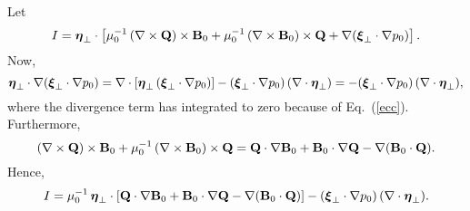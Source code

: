 \documentclass[12pt,prb,aps,notitlepage]{revtex4-1}
\newcommand{\bxi}{\mbox{\boldmath$\xi$}}
\newcommand{\bta}{\mbox{\boldmath$\eta$}}
\begin{document}
Let 
\begin{equation}\label{e43}
I= \bta_\perp\cdot\left[ \mu_0^{-1}\,(\nabla\times {\bf Q})\times{\bf B}_0+ \mu_0^{-1}\, (\nabla\times {\bf B}_0)\times {\bf Q}
+\nabla(\bxi_\perp\cdot\nabla p_0)\right].
\end{equation}
Now,
\begin{equation}
\bta_\perp\cdot\nabla (\bxi_\perp\cdot\nabla p_0)= \nabla\cdot[\bta_\perp\,(\bxi_\perp\cdot \nabla p_0)] - (\bxi_\perp\cdot\nabla p_0)\,(\nabla\cdot
\bta_\perp) =-(\bxi_\perp\cdot\nabla p_0)\,(\nabla\cdot
\bta_\perp),
\end{equation}
where the divergence term has integrated to zero because of Eq.~(\ref{ecc}). Furthermore, 
\begin{equation}
(\nabla\times {\bf Q})\times{\bf B}_0+ \mu_0^{-1}\, (\nabla\times {\bf B}_0)\times {\bf Q}= {\bf Q}\cdot\nabla{\bf B}_0
+ {\bf B}_0\cdot\nabla{\bf Q} - \nabla({\bf B}_0\cdot{\bf Q}).
\end{equation}
Hence,
\begin{equation}\label{e46}
I = \mu_0^{-1}\,\bta_\perp\cdot\left[ {\bf Q}\cdot\nabla{\bf B}_0
+ {\bf B}_0\cdot\nabla{\bf Q} - \nabla({\bf B}_0\cdot{\bf Q})\right]  - (\bxi_\perp\cdot\nabla p_0)\,(\nabla\cdot
\bta_\perp).
\end{equation}
\end{document}
